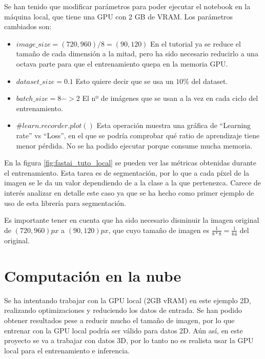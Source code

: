 Se han tenido que modificar parámetros para poder ejecutar el notebook en la máquina local, que tiene una GPU con 2 GB de VRAM. Los parámetros cambiados son:
\begin{itemize}
\item $image\_size = (720, 960) / 8 = (90, 120)$ En el tutorial ya se reduce el tamaño de cada dimensión a la mitad, pero ha sido necesario reducirlo a una octava parte para que el entrenamiento quepa en la memoria GPU.
\item $dataset\_size = 0.1$ Esto quiere decir que se usa un $10\%$ del dataset.
\item $batch\_size = 8 -> 2$ El nº de imágenes que se usan a la vez en cada ciclo del entrenamiento.
\item $\#learn.recorder.plot()$ Esta operación muestra una gráfica de “Learning rate” vs “Loss”, en el que se podría comprobar qué ratio de aprendizaje tiene menor pérdida. No se ha podido ejecutar porque consume mucha memoria.
\end{itemize}


En la figura \ref{fig:fastai_tuto_local} se pueden ver las métricas obtenidas durante el entrenamiento. Esta tarea es de segmentación, por lo que a cada píxel de la imagen se le da un valor dependiendo de a la clase a la que pertenezca. Carece de interés analizar en detalle este caso ya que se ha hecho como primer ejemplo de uso de esta librería para segmentación.

Es importante tener en cuenta que ha sido necesario disminuir la imagen original de $(720, 960)px$ a $(90, 120)px$, que cuyo tamaño de imagen es $\frac{1}{8*8}=\frac{1}{64}$ del original.

\section{Computación en la nube}\label{sec:cloud_dev}

Se ha intentando trabajar con la GPU local (2GB vRAM) en este ejemplo 2D, realizando optimizaciones y reduciendo los datos de entrada. Se han podido obtener resultados pese a reducir mucho el tamaño de imagen, por lo que entrenar con la GPU local podría ser válido para datos 2D. Aún así, en este proyecto se va a trabajar con datos 3D, por lo tanto no es realista usar la GPU local para el entrenamiento e inferencia.

